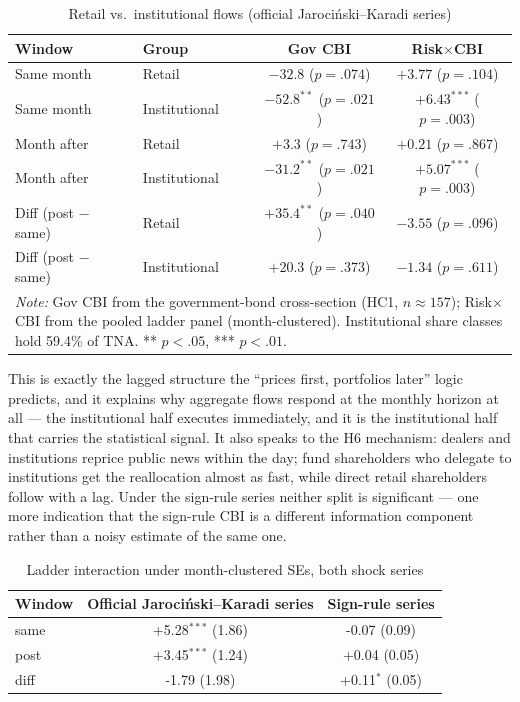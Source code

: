 \documentclass[11pt]{article}
\newcommand{\jk}{Jaroci\'{n}ski--Karadi}
\begin{document}
\begin{table}[H]
\centering\small
\caption{Retail vs.\ institutional flows (official \jk{} series)}
\begin{tabular}{llcc}
\toprule
Window & Group & Gov CBI & Risk$\times$CBI \\
\midrule
Same month & Retail & $-32.8$ ($p=.074$) & $+3.77$ ($p=.104$) \\
Same month & Institutional & $-52.8^{**}$ ($p=.021$) & $+6.43^{***}$ ($p=.003$) \\
Month after & Retail & $+3.3$ ($p=.743$) & $+0.21$ ($p=.867$) \\
Month after & Institutional & $-31.2^{**}$ ($p=.021$) & $+5.07^{***}$ ($p=.003$) \\
Diff (post $-$ same) & Retail & $+35.4^{**}$ ($p=.040$) & $-3.55$ ($p=.096$) \\
Diff (post $-$ same) & Institutional & $+20.3$ ($p=.373$) & $-1.34$ ($p=.611$) \\
\midrule
\multicolumn{4}{p{.9\linewidth}}{\footnotesize \emph{Note:} Gov CBI from the government-bond cross-section (HC1, $n\approx157$); Risk$\times$CBI from the pooled ladder panel (month-clustered). Institutional share classes hold 59.4\% of TNA. ** $p<.05$, *** $p<.01$.}\\
\bottomrule
\end{tabular}
\label{tab:investor}
\end{table}

This is exactly the lagged structure the ``prices first, portfolios later''
logic predicts, and it explains why aggregate flows respond at the monthly
horizon at all --- the institutional half executes immediately, and it is
the institutional half that carries the statistical signal. It also speaks
to the H6 mechanism: dealers and institutions reprice public news within
the day; fund shareholders who delegate to institutions get the reallocation
almost as fast, while direct retail shareholders follow with a lag. Under
the sign-rule series neither split is significant --- one more indication
that the sign-rule CBI is a different information component rather than a
noisy estimate of the same one.


\begin{table}[H]
\centering\small
\caption{Ladder interaction under month-clustered SEs, both shock series}
\begin{tabular}{lcc}
\toprule
Window & Official \jk{} series & Sign-rule series \\
\midrule
same & +5.28$^{***}$ (1.86) & -0.07 (0.09) \\
post & +3.45$^{***}$ (1.24) & +0.04 (0.05) \\
diff & -1.79 (1.98) & +0.11$^{*}$ (0.05) \\
\bottomrule
\end{tabular}
\label{tab:se}
\end{table}
\end{document}
